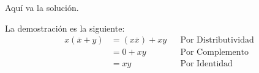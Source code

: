 \documentclass[answers]{exam}
\begin{document}
\begin{questions}
  \begin{solution}
    Aquí va la solución.
  \end{solution}

  \begin{solution}
    La demostración es la siguiente:
    \begin{align*}
      x(\overline{x} + y) &= (x\overline{x}) + xy && \text{Por Distributividad} \\
                          &= 0 + xy && \text{Por Complemento} \\
                          &= xy && \text{Por Identidad}
    \end{align*}
  \end{solution}


\end{questions}
\end{document}
